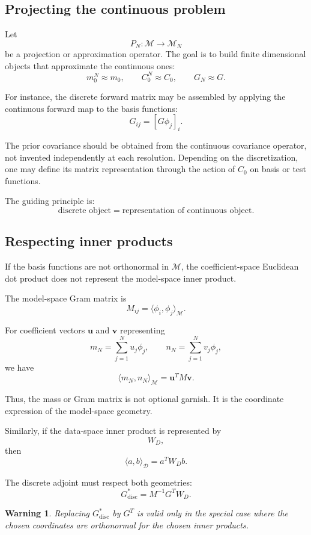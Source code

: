 \documentclass[11pt,a4paper]{book}
\newtheorem{warning}[definition]{Warning}
\newcommand{\M}{\mathcal{M}}      %
\newcommand{\D}{\mathcal{D}}      %
\newcommand{\G}{G}
\begin{document}
\subsection{Projecting the continuous problem}

Let
\[
    P_N:\M\to\M_N
\]
be a projection or approximation operator. The goal is to build finite
dimensional objects that approximate the continuous ones:
\[
    m_0^N \approx m_0,
    \qquad
    C_0^N \approx C_0,
    \qquad
    \G_N \approx \G.
\]

For instance, the discrete forward matrix may be assembled by applying the
continuous forward map to the basis functions:
\[
    G_{ij}
    =
    [\G\phi_j]_i.
\]

The prior covariance should be obtained from the continuous covariance operator,
not invented independently at each resolution. Depending on the discretization,
one may define its matrix representation through the action of $C_0$ on basis
or test functions.

The guiding principle is:
\[
    \text{discrete object}
    =
    \text{representation of continuous object}.
\]

\subsection{Respecting inner products}

If the basis functions are not orthonormal in $\M$, the coefficient-space
Euclidean dot product does not represent the model-space inner product.

The model-space Gram matrix is
\[
    M_{ij}
    =
    \langle \phi_i,\phi_j\rangle_{\M}.
\]

For coefficient vectors $\bm{u}$ and $\bm{v}$ representing
\[
    m_N=\sum_{j=1}^N u_j\phi_j,
    \qquad
    n_N=\sum_{j=1}^N v_j\phi_j,
\]
we have
\[
    \langle m_N,n_N\rangle_{\M}
    =
    \bm{u}^T M\bm{v}.
\]

Thus, the mass or Gram matrix is not optional garnish. It is the coordinate
expression of the model-space geometry.

Similarly, if the data-space inner product is represented by
\[
    W_D,
\]
then
\[
    \langle a,b\rangle_{\D}
    =
    a^T W_D b.
\]

The discrete adjoint must respect both geometries:
\[
    G^\ast_{\mathrm{disc}}
    =
    M^{-1}G^T W_D.
\]

\begin{warning}
Replacing $G^\ast_{\mathrm{disc}}$ by $G^T$ is valid only in the special case
where the chosen coordinates are orthonormal for the chosen inner products.
\end{warning}
\end{document}

